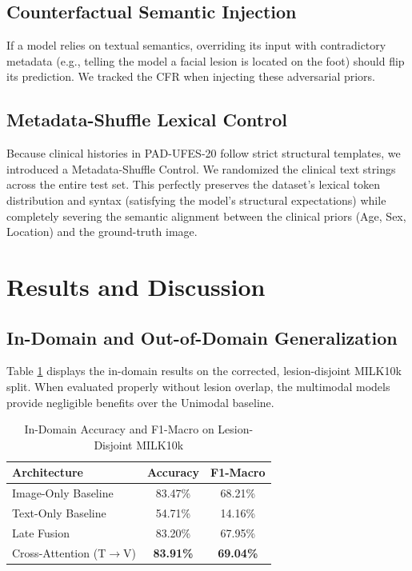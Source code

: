\documentclass[runningheads]{llncs}
\begin{document}
\subsection{Counterfactual Semantic Injection}
If a model relies on textual semantics, overriding its input with contradictory metadata (e.g., telling the model a facial lesion is located on the foot) should flip its prediction. We tracked the CFR when injecting these adversarial priors.

\subsection{Metadata-Shuffle Lexical Control}
Because clinical histories in PAD-UFES-20 follow strict structural templates, we introduced a Metadata-Shuffle Control. We randomized the clinical text strings across the entire test set. This perfectly preserves the dataset's lexical token distribution and syntax (satisfying the model's structural expectations) while completely severing the semantic alignment between the clinical priors (Age, Sex, Location) and the ground-truth image.

\section{Results and Discussion}

\subsection{In-Domain and Out-of-Domain Generalization}
Table \ref{tab:milk10k} displays the in-domain results on the corrected, lesion-disjoint MILK10k split. When evaluated properly without lesion overlap, the multimodal models provide negligible benefits over the Unimodal baseline. 

\begin{table}[h]
\centering
\caption{In-Domain Accuracy and F1-Macro on Lesion-Disjoint MILK10k}
\label{tab:milk10k}
\begin{tabular}{lcc}
\toprule
Architecture & Accuracy & F1-Macro \\
\midrule
Image-Only Baseline & 83.47\% & 68.21\% \\
Text-Only Baseline & 54.71\% & 14.16\% \\
Late Fusion & 83.20\% & 67.95\% \\
Cross-Attention (T$\rightarrow$V) & \textbf{83.91\%} & \textbf{69.04\%} \\
\bottomrule
\end{tabular}
\end{table}
\end{document}
